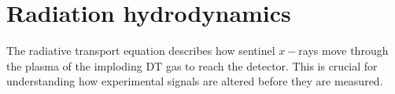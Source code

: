 \section{\label{sec:Radiation hydrodynamics}Radiation hydrodynamics}

The radiative transport equation describes how sentinel $x-$rays move through the plasma of the imploding DT gas to reach the detector. This is crucial for understanding how experimental signals are altered before they are measured.


%

\endinput %
